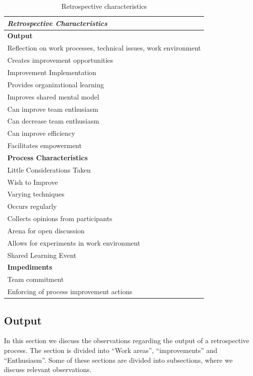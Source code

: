 \begin{table}[h]
	\begin{center}
		\caption{Retrospective characteristics}
		\label{table:retrospective-properties}
		\begin{tabular}{p{}}
			\hline
			\textit{Retrospective Characteristics}\\
			\hline
			\textbf{Output} \\
			Reflection on work processes, technical issues, work environment \\
			Creates improvement opportunities \\
			Improvement Implementation \\
			Provides organizational learning \\
			Improves shared mental model\\
			Can improve team enthusiasm \\
			Can decrease team enthusiasm \\ 
			Can improve efficiency  \\
			Facilitates empowerment \\
			\hline 
			\textbf{Process Characteristics}\\
			Little Considerations Taken \\
			Wish to Improve \\
			Varying techniques\\
			Occurs regularly\\
			Collects opinions from participants\\
			Arena for open discussion \\
			Allows for experiments in work environment\\
			Shared Learning Event\\
			\hline
			\textbf{Impediments}\\
			Team commitment\\
			Enforcing of process improvement actions\\
			\hline
		\end{tabular}
	\end{center}
\end{table}

\subsection{Output}
In this section we discuss the observations regarding the output of a retrospective process. The section is divided into ``Work areas'', ``improvements'' and ``Enthusiasm''. Some of these sections are divided into subsections, where we discuss relevant observations.

